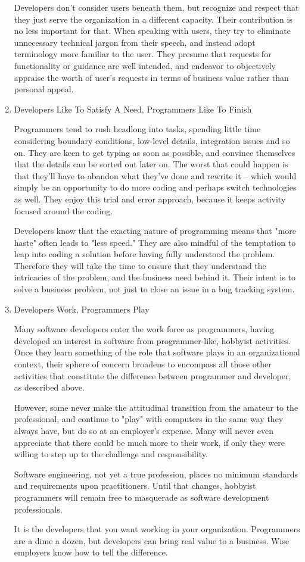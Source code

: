 \documentclass{article}
\begin{document}
\begin{enumerate}
Developers don't consider users beneath them, but recognize and respect
that they just serve the organization in a different capacity. Their
contribution is no less important for that. When speaking with users,
they try to eliminate unnecessary technical jargon from their speech,
and instead adopt terminology more familiar to the user. They presume
that requests for functionality or guidance are well intended, and
endeavor to objectively appraise the worth of user's requests in terms
of business value rather than personal appeal.

\item Developers Like To Satisfy A Need, Programmers Like To Finish
\label{sec:orgheadline132}

Programmers tend to rush headlong into tasks, spending little time
considering boundary conditions, low-level details, integration issues
and so on. They are keen to get typing as soon as possible, and convince
themselves that the details can be sorted out later on. The worst that
could happen is that they'll have to abandon what they've done and
rewrite it -- which would simply be an opportunity to do more coding and
perhaps switch technologies as well. They enjoy this trial and error
approach, because it keeps activity focused around the coding.

Developers know that the exacting nature of programming means that "more
haste" often leads to "less speed." They are also mindful of the
temptation to leap into coding a solution before having fully understood
the problem. Therefore they will take the time to ensure that they
understand the intricacies of the problem, and the business need behind
it. Their intent is to solve a business problem, not just to close an
issue in a bug tracking system.

\item Developers Work, Programmers Play
\label{sec:orgheadline133}

Many software developers enter the work force as programmers, having
developed an interest in software from programmer-like, hobbyist
activities. Once they learn something of the role that software plays in
an organizational context, their sphere of concern broadens to encompass
all those other activities that constitute the difference between
programmer and developer, as described above.

However, some never make the attitudinal transition from the amateur to
the professional, and continue to "play" with computers in the same way
they always have, but do so at an employer's expense. Many will never
even appreciate that there could be much more to their work, if only
they were willing to step up to the challenge and responsibility.

Software engineering, not yet a true profession, places no minimum
standards and requirements upon practitioners. Until that changes,
hobbyist programmers will remain free to masquerade as software
development professionals.

It is the developers that you want working in your organization.
Programmers are a dime a dozen, but developers can bring real value to a
business. Wise employers know how to tell the difference.
\end{enumerate}
\end{document}
